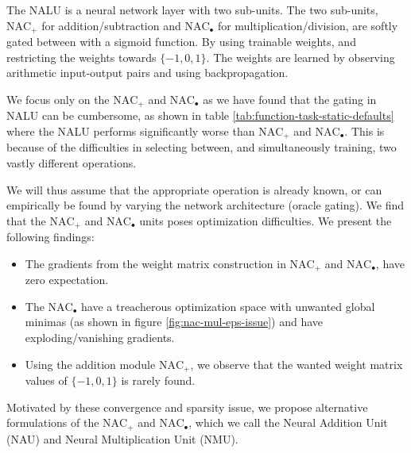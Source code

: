 The NALU is a neural network layer with two sub-units. The two sub-units, $\text{NAC}_{+}$ for addition/subtraction and $\text{NAC}_{\bullet}$ for multiplication/division, are softly gated between with a sigmoid function. By using trainable weights, and restricting the weights towards $\{-1,0,1\}$. The weights are learned by observing arithmetic input-output pairs and using backpropagation\cite{rumelhart1986learning}. 

We focus only on the $\text{NAC}_{+}$ and $\text{NAC}_{\bullet}$ as we have found that the gating in NALU can be cumbersome, as shown in table \ref{tab:function-task-static-defaults} where the NALU performs significantly worse than $\text{NAC}_{+}$ and $\text{NAC}_{\bullet}$. This is because of the difficulties in selecting between, and simultaneously training, two vastly different operations.

We will thus assume that the appropriate operation is already known, or can empirically be found by varying the network architecture (oracle gating). We find that the $\text{NAC}_{+}$ and $\text{NAC}_{\bullet}$ units poses optimization difficulties. We present the following findings:

\begin{itemize}
\item The gradients from the weight matrix construction in $\text{NAC}_{+}$ and $\text{NAC}_{\bullet}$, have zero expectation.

\item The $\text{NAC}_{\bullet}$ have a treacherous optimization space with unwanted global minimas (as shown in figure \ref{fig:nac-mul-eps-issue}) and have exploding/vanishing gradients.

\item Using the addition module $\text{NAC}_{+}$, we observe that the wanted weight matrix values of $\{-1, 0, 1\}$ is rarely found.
\end{itemize}

Motivated by these convergence and sparsity issue, we propose alternative formulations of the $\text{NAC}_{+}$ and $\text{NAC}_{\bullet}$, which we call the Neural Addition Unit (NAU) and Neural Multiplication Unit (NMU).


